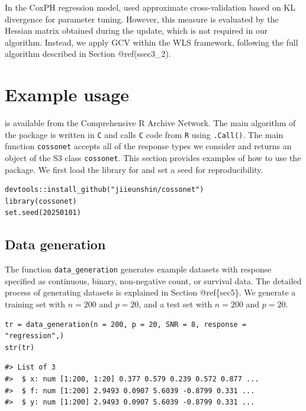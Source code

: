 In the CoxPH regression model, \citet{Leng:2006} used approximate cross-validation based on KL divergence for parameter tuning. However, this measure is evaluated by the Hessian matrix obtained during the update, which is not required in our algorithm. Instead, we apply GCV within the WLS framework, following the full algorithm described in Section @ref(ssec3\_2).

\hypertarget{sec4}{%
\section{Example usage}\label{sec4}}

 is available from the Comprehensive R Archive Network. The main algorithm of the  package is written in \texttt{C} and calls \texttt{C} code from \texttt{R} using \texttt{.Call()}. The main function \texttt{cossonet} accepts all of the response types we consider and returns an object of the S3 class \texttt{cossonet}. This section provides examples of how to use the  package. We first load the library for  and set a seed for reproducibility.

\begin{verbatim}
devtools::install_github("jiieunshin/cossonet")
library(cossonet)
set.seed(20250101)
\end{verbatim}

\hypertarget{ssec4_1}{%
\subsection{Data generation}\label{ssec4_1}}

The function \texttt{data\_generation} generates example datasets with response specified as continuous, binary, non-negative count, or survival data. The detailed process of generating datasets is explained in Section @ref\{sec5\}. We generate a training set with \(n=200\) and \(p=20\), and a test set with \(n=200\) and \(p=20\).

\begin{verbatim}
tr = data_generation(n = 200, p = 20, SNR = 8, response = "regression",)
str(tr)
\end{verbatim}

\begin{verbatim}
#> List of 3
#>  $ x: num [1:200, 1:20] 0.377 0.579 0.239 0.572 0.877 ...
#>  $ f: num [1:200] 2.9493 0.0907 5.6039 -0.8799 0.331 ...
#>  $ y: num [1:200] 2.9493 0.0907 5.6039 -0.8799 0.331 ...
\end{verbatim}

